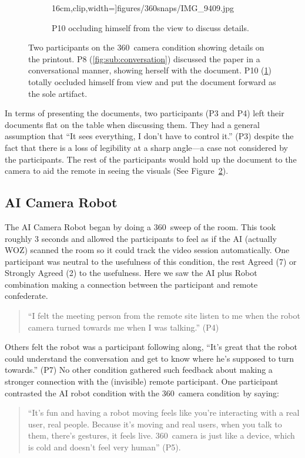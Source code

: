 \documentclass{tufte-handout}
\begin{document}
\begin{figure}
\begin{subfigure}[b]{0.85\columnwidth}
{      16cm},clip,width=\columnwidth]{figures/360snaps/IMG_9409.jpg}
  \caption{\label{fig:sub:noconversation} P10 occluding himself from
    the view to discuss details.}
  \end{subfigure}
  \caption{\label{fig:conversation} Two participants on the
    360\textdegree\ camera condition showing details on the printout.
    P8 (\ref{fig:sub:conversation}) discussed the paper in a
    conversational manner, showing herself with the document. P10
    (\ref{fig:sub:noconversation}) totally occluded himself
    from view and put the document forward as the sole artifact.}
\end{figure}

In terms of presenting the documents, two participants (P3 and P4)
left their documents flat on the table when discussing them.  They had
a general assumption that ``It sees everything, I don't have to
control it.'' (P3) despite the fact that there is a loss of legibility
at a sharp angle---a case not considered by the participants.  The
rest of the participants would hold up the document to the camera to
aid the remote in seeing the visuals (See
Figure~\ref{fig:conversation}).

\subsection{AI Camera Robot}
The AI Camera Robot began by doing a 360\textdegree\ sweep of the
room.  This took roughly 3 seconds and allowed the participants to
feel as if the AI (actually WOZ) scanned the room so it could track
the video session automatically.  One participant was neutral to the
usefulness of this condition, the rest Agreed (7) or Strongly Agreed
(2) to the usefulness. Here we saw the AI plus Robot combination
making a connection between the participant and remote confederate.
\begin{quote}
``I felt the meeting person from the remote site listen to me when the
robot camera turned towards me when I was talking.'' (P4)
\end{quote}
Others felt the robot was a participant following along, ``It's great
that the robot could understand the conversation and get to know where
he's supposed to turn towards.'' (P7) No other condition gathered such
feedback about making a stronger connection with the (invisible)
remote participant. One participant contrasted the AI robot condition
with the 360\textdegree\ camera condition by saying:
\begin{quote}
  ``It's fun and having a robot moving feels like you're interacting
  with a real user, real people. Because it's moving and real users,
  when you talk to them, there's gestures, it feels live.
  360\textdegree\ camera is just like a device, which is cold and
  doesn't feel very human'' (P5).
\end{quote}
\end{document}
